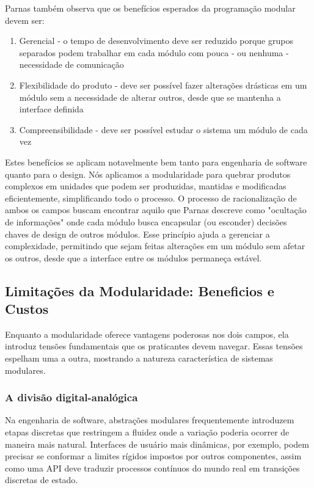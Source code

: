 \documentclass[12pt]{article}
\begin{document}
Parnas também observa que os benefícios esperados da programação modular devem ser:
\begin{enumerate}
    \item Gerencial - o tempo de desenvolvimento deve ser reduzido porque grupos separados podem trabalhar em cada módulo com pouca - ou nenhuma - necessidade de comunicação
    \item Flexibilidade do produto - deve ser possível fazer alterações drásticas em um módulo sem a necessidade de alterar outros, desde que se mantenha a interface definida
    \item Compreensibilidade - deve ser possível estudar o sistema um módulo de cada vez
\end{enumerate}

Estes benefícios se aplicam notavelmente bem tanto para engenharia de software quanto para o design. Nós aplicamos a modularidade para quebrar produtos complexos em unidades que podem ser produzidas, mantidas e modificadas eficientemente, simplificando todo o processo. O processo de racionalização de ambos os campos buscam encontrar aquilo que Parnas descreve como "ocultação de informações" onde cada módulo busca encapsular (ou esconder) decisões chaves de design de outros módulos. Esse princípio ajuda a gerenciar a complexidade, permitindo que sejam feitas alterações em um módulo sem afetar os outros, desde que a interface entre os módulos permaneça estável.

\subsection{Limitações da Modularidade: Beneficios e Custos}
Enquanto a modularidade oferece vantagens poderosas nos dois campos, ela introduz tensões fundamentais que os praticantes devem navegar. Essas tensões espelham uma a outra, mostrando a natureza característica de sistemas modulares.

\subsubsection{A divisão digital-analógica}
Na engenharia de software, abstrações modulares frequentemente introduzem etapas discretas que restringem a fluidez onde a variação poderia ocorrer de maneira mais natural. Interfaces de usuário mais dinâmicas, por exemplo, podem precisar se conformar a limites rígidos impostos por outros componentes, assim como uma API deve traduzir processos contínuos do mundo real em transições discretas de estado.
\end{document}
